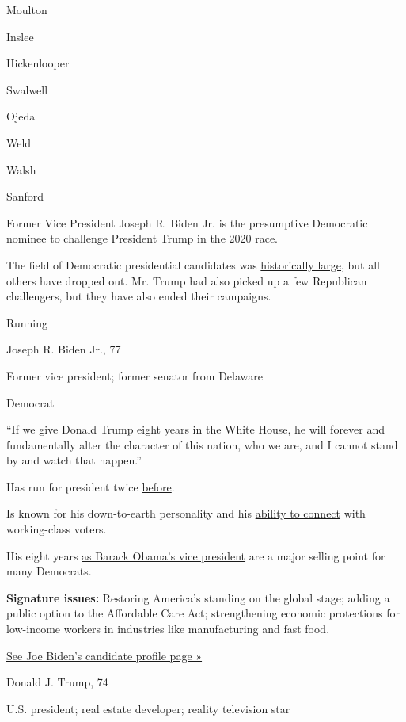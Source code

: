 Moulton

Inslee

Hickenlooper

Swalwell

Ojeda

Weld

Walsh

Sanford

Former Vice President Joseph R. Biden Jr. is the presumptive Democratic
nominee to challenge President Trump in the 2020 race.

The field of Democratic presidential candidates was
\href{https://www.nytimes3xbfgragh.onion/interactive/2019/02/14/us/politics/2020-democratic-candidates-president.html}{historically
large}, but all others have dropped out. Mr. Trump had also picked up a
few Republican challengers, but they have also ended their campaigns.

Running

Joseph R. Biden Jr., 77

Former vice president; former senator from Delaware

Democrat

``If we give Donald Trump eight years in the White House, he will
forever and fundamentally alter the character of this nation, who we
are, and I cannot stand by and watch that happen.''

Has run for president twice
\href{https://www.nytimes3xbfgragh.onion/2019/06/03/us/politics/biden-1988-presidential-campaign.html}{before}.

Is known for his down-to-earth personality and his
\href{https://www.nytimes3xbfgragh.onion/2019/11/19/us/politics/joe-biden-working-class.html}{ability
to connect} with working-class voters.

His eight years
\href{https://www.nytimes3xbfgragh.onion/2019/08/16/us/politics/biden-obama-history.html}{as
Barack Obama's vice president} are a major selling point for many
Democrats.

\textbf{Signature issues:} Restoring America's standing on the global
stage; adding a public option to the Affordable Care Act; strengthening
economic protections for low-income workers in industries like
manufacturing and fast food.

\href{https://www.nytimes3xbfgragh.onion/interactive/2020/us/elections/joe-biden.html}{See
Joe Biden's candidate profile page »}

Donald J. Trump, 74

U.S. president; real estate developer; reality television star

